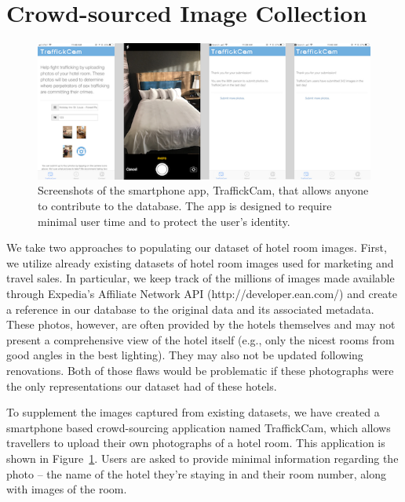 \section{Crowd-sourced Image Collection}
\begin{figure}[ht!]
  \begin{center}
    \includegraphics[width=\textwidth]{figures/chapter3/appScreenshots.png}
  \end{center}
  \caption[Smartphone app screenshots.]{Screenshots of the smartphone app, TraffickCam, that allows anyone to contribute to the database. The app is designed to require minimal user time and to protect the user's identity.}
  \label{fig:appScreenshots}
\end{figure}

We take two approaches to populating our dataset of hotel room images. First, we utilize already existing datasets of hotel room images used for marketing and travel sales. In particular, we keep track of the millions of images made available through Expedia’s Affiliate Network API (http://developer.ean.com/) and create a reference in our database to the original data and its associated metadata. These photos, however, are often provided by the hotels themselves and may not present a comprehensive view of the hotel itself (e.g., only the nicest rooms from good angles in the best lighting). They may also not be updated following renovations. Both of those flaws would be problematic if these photographs were the only representations our dataset had of these hotels. 

To supplement the images captured from existing datasets, we have created a smartphone based crowd-sourcing application named TraffickCam, which allows travellers to upload their own photographs of a hotel room. This application is shown in Figure~\ref{fig:appScreenshots}. Users are asked to provide minimal information regarding the photo -- the name of the hotel they're staying in and their room number, along with images of the room.

